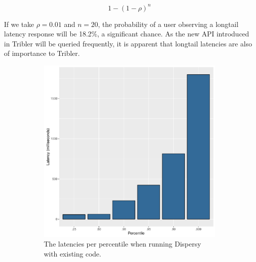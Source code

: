 \begin{equation}
	\label{eq:probability_high_latency}
	1 - (1 - \rho)^{n}
\end{equation}

If we take $\rho = 0.01$ and $n = 20$, the probability of a user observing a longtail latency response will be 18.2\%, a significant chance.
As the new API introduced in Tribler will be queried frequently, it is apparent that longtail latencies are also of importance to Tribler.

\begin{figure}[h]
	\begin{subfigure}[b]{.5\linewidth}
		\includegraphics[width=\textwidth]{experimentation/images/response_time_percentiles_sync}
		\caption{The latencies per percentile when running Dispersy with existing code.}
		\label{fig:response_times_percentiles_sync}
	\end{subfigure}
	\begin{subfigure}[b]{.5\linewidth}

\end{subfigure}
\end{figure}
